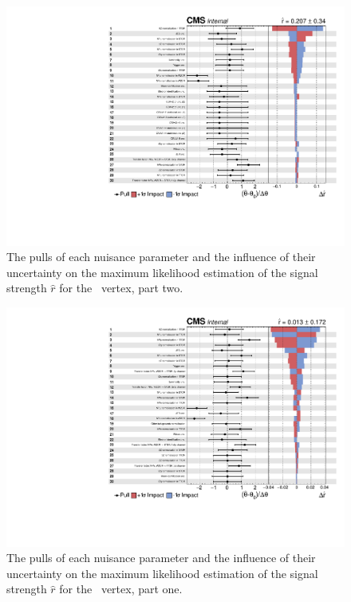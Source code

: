 \begin{figure}[htbp] 
	\centering
	\includegraphics[page=2,width=.99\linewidth,keepaspectratio]{6_Search/Figures/impact/171102Zut.pdf}
	\caption{The pulls of each nuisance parameter and the influence of their uncertainty on the maximum likelihood estimation of the signal strength $\hat{r}$ for the \Zut\ vertex, part two.}
	\label{fig:impactsZut}
\end{figure}

\newpage

\begin{figure}[htbp] 
	\centering
	\includegraphics[page=1,width=.99\linewidth,keepaspectratio]{6_Search/Figures/impact/171102Zct.pdf}
	\caption{The pulls of each nuisance parameter and the influence of their uncertainty on the maximum likelihood estimation of the signal strength $\hat{r}$ for the \Zct\ vertex, part one.}
	\label{fig:impactsZct1}
\end{figure}

